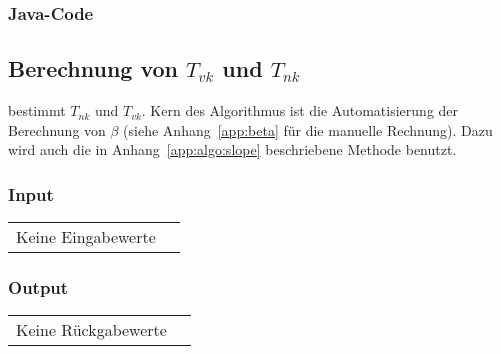 \subsubsection*{Java-Code}



\clearpage
\subsection{Berechnung von $T_{vk}$ und $T_{nk}$}
\label{app:algo:tnktvk}

    bestimmt   $T_{nk}$    und   $T_{vk}$. Kern    des
Algorithmus  ist  die  Automatisierung   der  Berechnung  von  $\beta$  (siehe
Anhang~\ref{app:beta}  f\"ur die  manuelle  Rechnung). Dazu wird  auch die  in
Anhang~\ref{app:algo:slope} beschriebene Methode  benutzt.

\subsubsection*{Input}

\begin{tabular}{p{40mm}l}
    Keine Eingabewerte &
\end{tabular}

\subsubsection*{Output}
\begin{tabular}{p{40mm}l}
    Keine R\"uckgabewerte &
\end{tabular}

